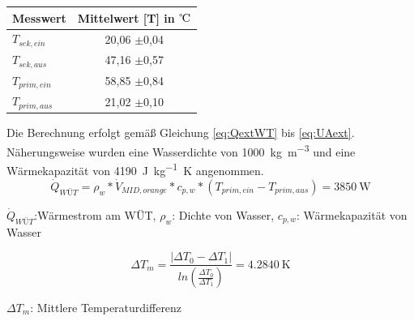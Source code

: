\begin{center}
	\begin{tabular}{l|c}
		\label{tab:extWT}
		
		\textbf{Messwert} & \textbf{Mittelwert} [T] in ${\celsius}$\\
		\hline
	$T_{sek,ein}$ & 20,06 $\pm$0,04\\
	$T_{sek,aus}$ & 47,16 $\pm$0,57\\
	$T_{prim,ein}$ & 58,85 $\pm$0,84\\
	$T_{prim,aus}$ & 21,02 $\pm$0,10\\

	\end{tabular}
\end{center}
Die Berechnung erfolgt gemäß Gleichung \ref{eq:QextWT} bis \ref{eq:UAext}. Näherungsweise wurden eine Wasserdichte von \SI{1000}{\kilogram\per\cubic\meter} und eine Wärmekapazität von \SI{4190}{\joule\per\kilogram\kelvin} angenommen.
\begin{equation}
	\label{eq:QextWT}
	\dot Q_{WÜT} = \rho_{w} * \dot V_{MID,orange} * c_{p,w} * (T_{prim,ein}-T_{prim,aus}) = \SI{3850}{\watt}
\end{equation}

\begin{center}
	\begin{small}
	$\dot Q_{WÜT}$:Wärmestrom am WÜT,	
	$\rho_{w}$:	Dichte von Wasser,
	$c_{p,w}$: Wärmekapazität von Wasser
	\end{small}
\end{center}

\begin{equation}
	\label{eq:DeltaTm}
	\Delta T_{m} = \frac{|\Delta T_{0} - \Delta T_{1}|}{ln(\frac{\Delta T_{0}}{\Delta T_{1}})} = \SI{4,2840}{\kelvin}
\end{equation}
\begin{center}
	\begin{small}
		$\Delta T_{m}$: Mittlere Temperaturdifferenz
	\end{small}
\end{center}

